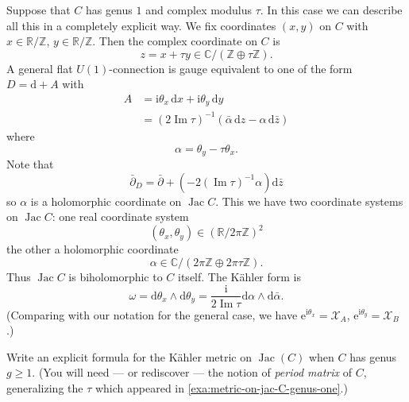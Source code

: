\documentclass[12pt,letterpaper,reqno]{article}
\numberwithin{equation}{section}
\newcommand{\cX}{\ensuremath{\mathcal X}}
\newcommand{\R}{\ensuremath{\mathbb R}}
\newcommand{\C}{\ensuremath{\mathbb C}}
\newcommand{\Z}{\ensuremath{\mathbb Z}}
\newcommand{\kahler}{K\"ahler\xspace}
\newcommand{\I}{{\mathrm i}}
\newcommand{\e}{{\mathrm e}}
\newcommand{\de}{\mathrm{d}}
\newcommand{\ti}[1]{\textit{#1}}
\DeclareMathOperator{\im}{Im}
\DeclareMathOperator{\Jac}{Jac}
\begin{document}
\begin{example} \label{exa:metric-on-jac-C-genus-one}
Suppose that $C$ has genus $1$ and complex modulus $\tau$.
In this case we can describe all this in a completely explicit way.
We fix coordinates $(x,y)$ on $C$ with $x \in \R/\Z$, $y \in \R/\Z$.
Then the complex coordinate on $C$ is
\begin{equation}
  z = x + \tau y \in \C / (\Z \oplus \tau \Z).
\end{equation}
A general flat $U(1)$-connection
is gauge equivalent to one of the form $D = \de + A$ with
\begin{align}
  A &= \I \theta_x \, \de x + \I \theta_y \, \de y \\
  &= (2 \im \tau)^{-1} (\bar\alpha \, \de z - \alpha \, \de \bar{z})
\end{align}
where
\begin{equation}
  \alpha = \theta_y - \tau \theta_x.
\end{equation}
Note that
\begin{equation}
  \bar\partial_D = \bar\partial + (-2 (\im \tau)^{-1} \alpha) \de \bar{z} 
\end{equation}
so $\alpha$ is a holomorphic coordinate on $\Jac C$.  
This we have two coordinate systems on $\Jac C$: one
real coordinate system
\begin{equation}
(\theta_x, \theta_y) \in (\R / 2\pi\Z)^2
\end{equation}
the other a holomorphic coordinate
\begin{equation}
\alpha \in \C / \left( 2\pi \Z \oplus  2\pi \tau \Z\right).
\end{equation}
Thus $\Jac C$ is biholomorphic to $C$ itself.
The \kahler form is
\begin{equation}
  \omega = \de \theta_x \wedge \de \theta_y = \frac{\I}{2 \im \tau} \de \alpha \wedge \de \bar\alpha.
\end{equation}
(Comparing with our notation for the general case, 
we have $\e^{\I \theta_x} = \cX_A$, $\e^{\I \theta_y} = \cX_B$.)
\end{example}

\begin{exercise}
Write an explicit formula for the \kahler metric on $\Jac(C)$
when $C$ has genus $g \ge 1$. (You will need --- or rediscover ---
the notion of \ti{period matrix} of $C$, generalizing the $\tau$
which appeared in \autoref{exa:metric-on-jac-C-genus-one}.)
\end{exercise}
\end{document}
